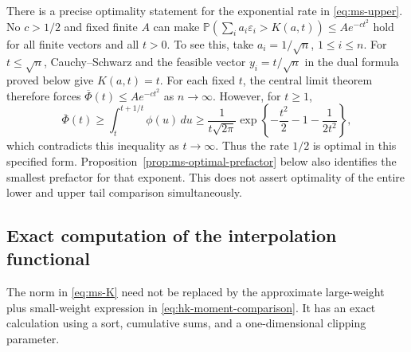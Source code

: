 \documentclass[11pt,letterpaper]{article}
\numberwithin{equation}{section}
\theoremstyle{definition}
\theoremstyle{remark}
\begin{document}
There is a precise optimality statement for the exponential rate in
\eqref{eq:ms-upper}. No $c>1/2$ and fixed finite $A$ can make
$\mathbb P(\sum_i a_i\varepsilon_i>K(a,t))\le A e^{-ct^2}$ hold for all
finite vectors and all $t>0$. To see this, take $a_i=1/\sqrt n$,
$1\le i\le n$. For $t\le\sqrt n$, Cauchy--Schwarz and the feasible vector
$y_i=t/\sqrt n$ in the dual formula proved below give $K(a,t)=t$.
For each fixed $t$, the central limit theorem therefore forces
$\overline\Phi(t)\le A e^{-ct^2}$ as $n\to\infty$. However, for $t\ge1$,
\[
 \overline\Phi(t)\ge\int_t^{t+1/t}\phi(u)\,du
 \ge\frac{1}{t\sqrt{2\pi}}
         \exp\left\{-\frac{t^2}{2}-1-\frac{1}{2t^2}\right\},
\]
which contradicts this inequality as $t\to\infty$.
Thus the rate $1/2$ is optimal in this specified form.
Proposition~\ref{prop:ms-optimal-prefactor} below also identifies the
smallest prefactor for that exponent. This does not assert
optimality of the entire lower and upper tail comparison simultaneously.

\subsection{Exact computation of the interpolation functional}

The norm in \eqref{eq:ms-K} need not be replaced by the approximate
large-weight plus small-weight expression in
\eqref{eq:hk-moment-comparison}. It has an exact calculation using a sort,
cumulative sums, and a one-dimensional clipping parameter.
\end{document}
